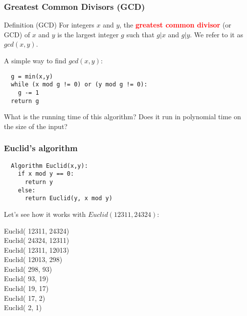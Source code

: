 \begin{frame}[fragile]
  \frametitle{Greatest Common Divisors (GCD)}

  \begin{block}{Definition (GCD)}
    For integers $x$ and $y$, the \textcolor{red}{\bf greatest common
      divisor} (or GCD) of $x$ and $y$ is the largest integer $g$ such
    that $g|x$ and $g|y$.  We refer to it as $gcd(x,y)$.
  \end{block}

  \vspace{0.1in}
  \pause
  A simple way to find $gcd(x,y)$:

  \begin{tcolorbox}
  {\small
\begin{verbatim}
  g = min(x,y)
  while (x mod g != 0) or (y mod g != 0):
    g -= 1
  return g
\end{verbatim}
  }
  \end{tcolorbox}
  
\pause What is the running time of this algorithm? \pause
Does it run in polynomial time on the size of the input?
\end{frame}

\begin{frame}[fragile]
  \frametitle{Euclid's algorithm}
  
  \begin{tcolorbox}
  {\small
\begin{verbatim}
  Algorithm Euclid(x,y):
    if x mod y == 0:
      return y
    else:
      return Euclid(y, x mod y)
\end{verbatim}
  }
  \end{tcolorbox}

  \pause
  Let's see how it works with $Euclid(12311,24324)$:
  
  {\footnotesize
    Euclid( 12311, 24324) \\
    Euclid( 24324, 12311) \\
    Euclid( 12311, 12013) \\
    Euclid( 12013,   298) \\
    Euclid(   298,    93) \\
    Euclid(    93,    19) \\
    Euclid(    19,    17) \\
    Euclid(    17,     2) \\
    Euclid(     2,     1) \\
  }
\end{frame}

